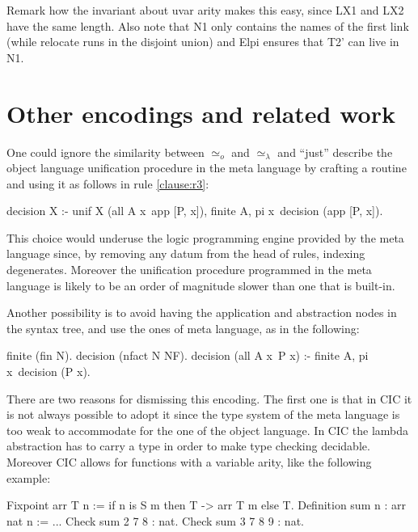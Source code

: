 \documentclass[sigconf,natbib=false,review]{acmart}
\newcommand{\UnifRel}{\ensuremath{\simeq}}
\newcommand{\Uo}{\ensuremath{\UnifRel_o}\xspace}
\newcommand{\Ue}{\ensuremath{\UnifRel_\lambda}\xspace}
\begin{document}
Remark how the invariant about uvar arity makes this easy, since LX1 and LX2
have the same length. Also note that N1 only contains the names of the first
link (while relocate runs in the disjoint union) and Elpi ensures that
T2' can live in N1.


\section{Other encodings and related work}\label{sec:encodings}

\noindent
One could ignore the similarity between \Uo{} and \Ue{} and ``just''
describe the object language unification procedure in the meta language by
crafting a  routine and using it as follows in
rule \ref{clause:r3}:

\begin{elpicode}
decision X :- unif X (all A x\ app [P, x]), finite A,
  pi x\ decision (app [P, x]).
\end{elpicode}

\noindent
This choice would underuse the logic programming engine provided by
the meta language since, by removing any datum from the head of rules,
indexing degenerates. Moreover the unification procedure 
programmed in the meta language is likely to be an order of magnitude
slower than one that is built-in.

Another possibility is to avoid having the application and abstraction nodes
in the syntax tree, and use the ones of meta language, as in the following:

\begin{elpicode}
finite (fin N).
decision (nfact N NF).
decision (all A x\ P x) :- finite A, pi x\ decision (P x).
\end{elpicode}

\noindent
There are two reasons for dismissing this encoding. The first one is that
in CIC it is not always possible to adopt it since the type system
of the meta language is too weak to accommodate for the one of the 
object language. In CIC the lambda abstraction has to carry a type in order to
make type checking decidable. Moreover CIC allows for functions with a
variable arity, like the following example:

\begin{coqcode}
Fixpoint arr T n := if n is S m then T -> arr T m else T.
Definition sum n : arr nat n := ...
Check sum 2   7 8   : nat.
Check sum 3   7 8 9 : nat.
\end{coqcode}
\end{document}
